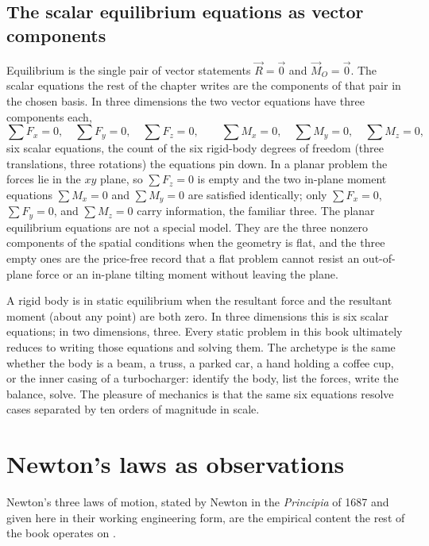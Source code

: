 \subsection{The scalar equilibrium equations as vector components}

Equilibrium is the single pair of vector statements $\vec{R} = \vec{0}$ and
$\vec{M}_O = \vec{0}$. The scalar equations the rest of the chapter writes
are the components of that pair in the chosen basis. In three dimensions
the two vector equations have three components each,
\[
\sum F_x = 0, \quad \sum F_y = 0, \quad \sum F_z = 0, \qquad
\sum M_x = 0, \quad \sum M_y = 0, \quad \sum M_z = 0,
\]
six scalar equations, the count of the six rigid-body degrees of freedom
(three translations, three rotations) the equations pin down. In a planar
problem the forces lie in the $xy$ plane, so $\sum F_z = 0$ is empty and
the two in-plane moment equations $\sum M_x = 0$ and $\sum M_y = 0$ are
satisfied identically; only $\sum F_x = 0$, $\sum F_y = 0$, and
$\sum M_z = 0$ carry information, the familiar three. The planar
equilibrium equations are not a special model. They are the three nonzero
components of the spatial conditions when the geometry is flat, and the
three empty ones are the price-free record that a flat problem cannot
resist an out-of-plane force or an in-plane tilting moment without leaving
the plane.

\begin{archetype}[Balance]
A rigid body is in static equilibrium when the resultant force and the
resultant moment (about any point) are both zero. In three dimensions
this is six scalar equations; in two dimensions, three. Every static
problem in this book ultimately reduces to writing those equations and
solving them. The archetype is the same whether the body is a beam, a
truss, a parked car, a hand holding a coffee cup, or the inner casing
of a turbocharger: identify the body, list the forces, write the
balance, solve. The pleasure of mechanics is that the same six
equations resolve cases separated by ten orders of magnitude in scale.
\end{archetype}

\section{Newton's laws as observations}

Newton's three laws of motion, stated by Newton in the
\emph{Principia} of 1687 and given here in their working engineering
form, are the empirical content the rest of the book operates on
\cite[Axioms, pp.~416--417]{hist:newton1687}.

